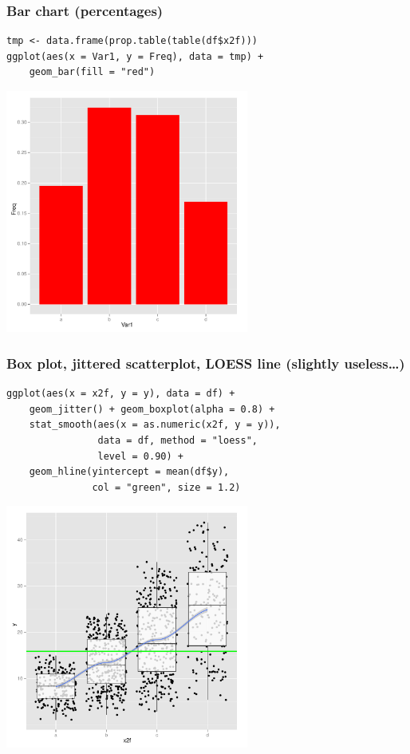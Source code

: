 \documentclass[bigger]{beamer}
\begin{document}
\begin{frame}[fragile,shrink = 10]
\frametitle{Bar chart (percentages)}
\label{sec-3_11}

\lstset{language=R}
\begin{lstlisting}
tmp <- data.frame(prop.table(table(df$x2f)))
ggplot(aes(x = Var1, y = Freq), data = tmp) + 
    geom_bar(fill = "red")
\end{lstlisting}



\includegraphics[width=0.6\textwidth]{../graphs/ggplot2_barchart_p.pdf}
\end{frame}
\begin{frame}[fragile,shrink = 10]
\frametitle{Box plot, jittered scatterplot, LOESS line (slightly useless\ldots)}
\label{sec-3_12}

\lstset{language=R}
\begin{lstlisting}
ggplot(aes(x = x2f, y = y), data = df) +
    geom_jitter() + geom_boxplot(alpha = 0.8) + 
    stat_smooth(aes(x = as.numeric(x2f, y = y)), 
                data = df, method = "loess", 
                level = 0.90) + 
    geom_hline(yintercept = mean(df$y), 
               col = "green", size = 1.2)
\end{lstlisting}



\includegraphics[width=0.6\textwidth]{../graphs/ggplot2_boxplot.pdf}


  
\end{frame}
\end{document}
